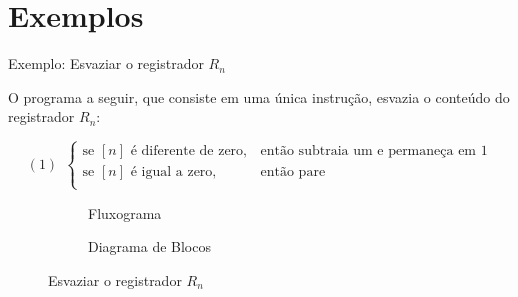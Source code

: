 \section{Exemplos}

\begin{frame}[fragile]{Exemplo: Esvaziar o registrador $R_n$}

    O programa a seguir, que consiste em uma única instrução, esvazia o conteúdo do registrador
    $R_n$:
    \begin{small}
    \[
        (1)\ \ \left\lbrace \begin{array}{ll}
                    \mbox{se $[n]$ é diferente de zero},& \mbox{então subtraia um e permaneça em $1$}\\
                    \mbox{se $[n]$ é igual a zero},& \mbox{então pare}\\
                \end{array}\right.
    \]
    \end{small}

    \renewcommand{\figurename}{Exemplo}
    \begin{figure}[ht]
        \centering
        \begin{subfigure}{.45\textwidth}
            \centering
            \caption{Fluxograma}
        \end{subfigure}
        \begin{subfigure}{.45\textwidth}
            \centering
            \caption{Diagrama de Blocos}
        \end{subfigure}
        \caption{Esvaziar o registrador $R_n$}
    \end{figure}
\end{frame}

